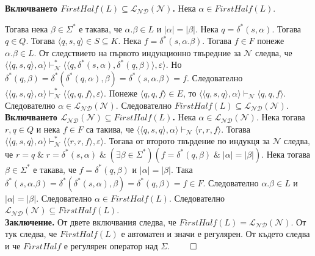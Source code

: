 \documentclass[12pt]{article}
\begin{document}
\textbf{Включването \(FirstHalf(L) \subseteq \mathcal{L_{ND}}(\mathcal N)\).}
Нека \(\alpha \in FirstHalf(L)\).

Тогава нека \(\beta \in \Sigma^*\) е такава, че
\(\alpha.\beta \in L\) и \(|\alpha| = |\beta|\). Нека \(q = \delta^*(s, \alpha)\).
Тогава \(q \in Q\). Тогава \(\langle q, s, q \rangle \in S \subseteq K\).
Нека \(f = \delta^*(s, \alpha.\beta)\). Тогава \(f \in F\) понеже \(\alpha.\beta \in L\).
От следствието на първото индукционно твъредние за \(\mathcal N\) следва, че
\(\langle \langle q, s, q \rangle, \alpha \rangle \vdash_{\mathcal N}^*  \langle \langle q, \delta^*(s, \alpha), \delta^*(q, \beta) \rangle, \varepsilon \rangle\).
Но \(\delta^*(q, \beta) = \delta^*(\delta^*(q, \alpha), \beta) = \delta^*(s, \alpha.\beta) = f\).
Следователно \(\langle \langle q, s, q \rangle, \alpha \rangle \vdash_{\mathcal N}^*  \langle \langle q, q, f \rangle, \varepsilon \rangle\). Понеже \(\langle q, q, f \rangle \in E\), то
\(\langle \langle q, s, q \rangle, \alpha \rangle \vdash_{\mathcal N} \langle q, q, f \rangle\).
Следователно \(\alpha \in \mathcal{L_{ND}}(\mathcal N)\).
Следователно \(FirstHalf(L) \subseteq \mathcal{L_{ND}}(\mathcal N)\). \\

\textbf{Включването \(\mathcal{L_{ND}}(\mathcal N) \subseteq FirstHalf(L)\).}
Нека \(\alpha \in \mathcal{L_{ND}}(\mathcal N)\).
Нека тогава \(r, q \in Q\) и нека \(f \in F\) са такива, че
\(\langle \langle q, s, q \rangle, \alpha \rangle \vdash_{\mathcal N} \langle r, r, f \rangle\).
Тогава \(\langle \langle q, s, q \rangle, \alpha \rangle \vdash_{\mathcal N}^*  \langle \langle r, r, f \rangle, \varepsilon \rangle\). Тогава от второто твърдение по индукця за \(\mathcal N\) следва, че
\(r = q \;\&\; r = \delta^*(s, \alpha) \;\&\; (\exists \beta \in \Sigma^*)(f = \delta^*(q, \beta) \;\&\; |\alpha| = |\beta|)\). Нека тогава \(\beta \in \Sigma^*\) е такава, че \(f = \delta^*(q, \beta)\) и \(|\alpha| = |\beta|\). Така \(\delta^*(s, \alpha.\beta) = \delta^*(\delta^*(s, \alpha), \beta) = \delta^*(q, \beta) = f \in F\). Следователно \(\alpha.\beta \in L\) и \(|\alpha| = |\beta|\).
Следователно \(\alpha \in FirstHalf(L)\).
Следователно \(\mathcal{L_{ND}}(\mathcal N) \subseteq FirstHalf(L)\). \\

\textbf{Заключение.}
От двете включвания следва, че \(FirstHalf(L) = \mathcal{L_{ND}}(\mathcal N)\).
От тук следва, че \(FirstHalf(L)\) е автоматен и значи е регулярен.
От където следва и че \(FirstHalf\) е регулярен оператор над \(\Sigma\). \(\qed\)
\end{document}
